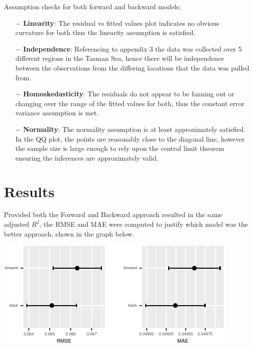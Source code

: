 \documentclass[letterpaper,9pt,twocolumn,twoside,]{pinp}
\begin{document}
Assumption checks for both forward and backward models;

\begin{itemize}
     \item[$-$] \textbf{Linearity}: The residual vs fitted values plot indicates no obvious curvature for both thus the linearity assumption is satisfied.
     \item[$-$] \textbf{Independence}: Referencing to appendix 3 the data was collected over 5 different regions in the Tasman Sea, hence there will be independence between the observations from the differing locations that the data was pulled from.
     \item[$-$] \textbf{Homoskedasticity}: The residuals do not appear to be fanning out or changing over the range of the fitted values for both, thus the constant error variance assumption is met.
     \item[$-$] \textbf{Normality}: The normality assumption is at least approximately satisfied. In the QQ plot, the points are reasonably close to the diagonal line, however the sample size is large enough to rely upon the central limit theorem ensuring the inferences are approximately valid.
\end{itemize}

\hypertarget{results}{%
\section{Results}\label{results}}

Provided both the Forward and Backward approach resulted in the same
adjusted \(R^2\), the RMSE and MAE were computed to justify which model
was the better approach, shown in the graph below.

\begin{center}\includegraphics{ExecSum_files/figure-latex/unnamed-chunk-8-1} \end{center}
\end{document}
